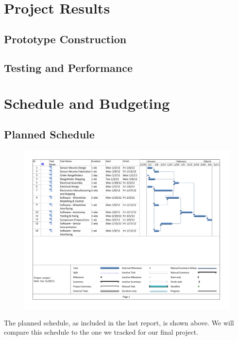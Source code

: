 \documentclass[oneside,final,a4paper]{report}
\begin{document}
\chapter{Project Results}

\section{Prototype Construction}

\section{Testing and Performance}

\chapter{Schedule and Budgeting}

\section{Planned Schedule}
\begin{figure}
 \centering
 \includegraphics[scale=0.6]{gantt} \label{fig:gantt}
\end{figure}

The planned schedule, as included in the last report, is shown above. We will compare this schedule to the one we tracked for our final project.
\end{document}
